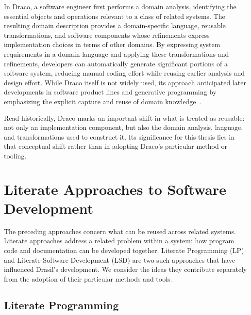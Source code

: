 In Draco, a software engineer first performs a domain analysis, identifying the
essential objects and operations relevant to a class of related systems. The
resulting domain description provides a domain-specific language, reusable
transformations, and software components whose refinements express
implementation choices in terms of other domains. By expressing system
requirements in a domain language and applying these transformations and
refinements, developers can automatically generate significant portions of a
software system, reducing manual coding effort while reusing earlier analysis
and design effort. While Draco itself is not widely used, its approach
anticipated later developments in software product lines and generative
programming by emphasizing the explicit capture and reuse of domain
knowledge~\citep{Neighbors1984,Czarnecki2000}.

Read historically, Draco marks an important shift in what is treated as
reusable: not only an implementation component, but also the domain analysis,
language, and transformations used to construct it. Its significance for this
thesis lies in that conceptual shift rather than in adopting Draco's particular
method or tooling.


\section{Literate Approaches to Software Development}
\label{sec:literate}

The preceding approaches concern what can be reused across related systems.
Literate approaches address a related problem within a system: how program code
and documentation can be developed together. Literate Programming (LP) and
Literate Software Development (LSD) are two such approaches that have
influenced Drasil's development. We consider the
ideas they contribute separately from the adoption of their particular methods
and tools.

\subsection{Literate Programming}

